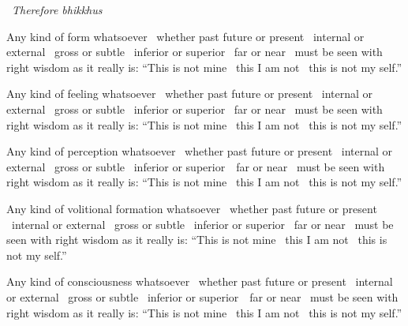 \begin{leader-english-only}
  \anglebracketleft\ \hspace{-0.5mm}\textit{Therefore bhikkhus} \hspace{-0.5mm}\anglebracketright\
\end{leader-english-only}

\vspace{-0.99em} %

\begin{english-only-hang}
  Any kind of form whatsoever \breathmark\ whether past future or present \breathmark\ internal or external \breathmark\ gross or subtle \breathmark\ inferior or superior \breathmark\ far or near \breathmark\ must be seen with right wisdom as it really is: ``This is not mine \breathmark\ this I am not \breathmark\ this is not my self.''
\end{english-only-hang}

\begin{english-only-hang}
  Any kind of feeling whatsoever \breathmark\ whether past future or present \breathmark\ internal or external \breathmark\ gross or subtle \breathmark\ inferior or superior \breathmark\ far or near \breathmark\ must be seen with right wisdom as it really is: ``This is not mine \breathmark\ this I am not \breathmark\ this is not my self.''
\end{english-only-hang}

\begin{english-only-hang}
  Any kind of perception whatsoever \breathmark\ whether past future or present \breathmark\ internal or external \breathmark\ gross or subtle \breathmark\ inferior or \mbox{superior}~\breathmark\ far or near \breathmark\ must be seen with right wisdom as it really is: ``This is not mine \breathmark\ this I am not \breathmark\ this is not my self.''
\end{english-only-hang}

\begin{english-only-hang}
  Any kind of volitional formation whatsoever \breathmark\ whether past future or present \breathmark\ internal or external \breathmark\ gross or subtle \breathmark\ inferior or superior \breathmark\ far or near \breathmark\ must be seen with right wisdom as it really is: ``This is not mine \breathmark\ this I am not \breathmark\ this is not my self.''
\end{english-only-hang}

\begin{english-only-hang}
  Any kind of consciousness whatsoever \breathmark\ whether past future or present \breathmark\ internal or external \breathmark\ gross or subtle \breathmark\ inferior or \mbox{superior}~\breathmark\ far or near \breathmark\ must be seen with right wisdom as it really is: ``This is not mine \breathmark\ this I am not \breathmark\ this is not my self.''
\end{english-only-hang}

